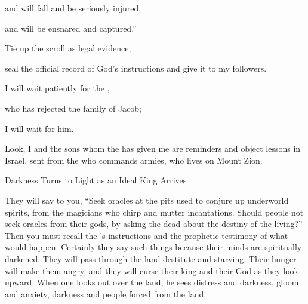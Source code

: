{\par }{\Q and will fall
and be
seriously injured,
\par }{\Q and will be
ensnared
and captured.”
\par }{\Q {}Tie up
the scroll as legal evidence,
\par }{\Q seal
the official record of
God’s instructions
and give it to my followers.
\par }{\Q {}I will wait patiently
for the
{},
\par }{\Q who has rejected
the family
of Jacob;
\par }{\Q I will wait for him.
\par }{\Q {}Look,
I
and the sons
whom
the {}
has given
me are reminders
and object lessons
in Israel,
sent from
the {}
who commands armies,
who lives
on Mount
Zion.
\par }{\SH Darkness Turns to Light as an Ideal King Arrives
\par }{\PP {}They will say
to
you, “Seek
oracles
at the pits used to
conjure
up underworld
spirits, from the magicians
who chirp
and mutter
incantations. Should people
not
seek
oracles
from their gods,
by asking the dead
about
the destiny
of the living?”
Then you must recall the
{}’s instructions
and the prophetic testimony
of what would happen. Certainly they say
such things
because their minds are spiritually darkened.
They will pass
through the land destitute
and starving.
Their hunger
will
make them angry,
and they will curse
their king
and their God
as they look
upward.
When one looks out
over the land,
he sees
distress
and darkness,
gloom
and anxiety,
darkness
and people forced from the land.

}
